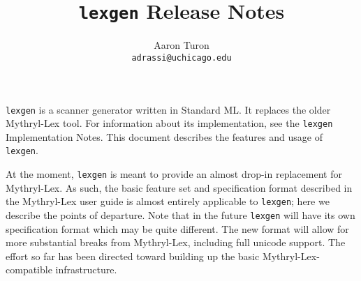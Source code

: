 
\usepackage[top=1.25in, bottom=1.25in, left=1.33in, right=1.33in]{geometry}
\usepackage{amsmath}
\usepackage[all]{xy}
\usepackage{graphicx}

\newcommand{\flex}{\texttt{lexgen}}

\title{\flex{} Release Notes}
\author{Aaron Turon\\
\texttt{adrassi@uchicago.edu}}



\maketitle

\flex{} is a scanner generator written in Standard ML.  It replaces the older
Mythryl-Lex tool.  For information about its implementation, see the
\flex{} Implementation Notes. This document describes the features and usage of
\flex{}.

At the moment, \flex{} is meant to provide an almost drop-in replacement for
Mythryl-Lex.  As such, the basic feature set and specification format described in
the Mythryl-Lex user guide is almost entirely applicable to \flex{}; here we describe
the points of departure.  Note that in the future \flex{} will have its own
specification format which may be quite different.  The new format will allow
for more substantial breaks from Mythryl-Lex, including full unicode support.  The
effort so far has been directed toward building up the basic Mythryl-Lex-compatible
infrastructure.

